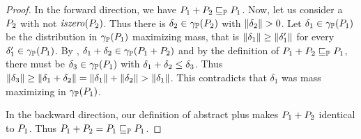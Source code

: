 \begin{proof}
In the
forward direction, we have $ P_{1} + P_{2} \sqsubseteq_{\mathbb{P}} P_{1} $. Now, let
us consider a $ P_{2} $ with not $ \mathit{iszero}(P_{2}) $. Thus there is
$ \delta_2 \in \gamma_{\mathbb{P}}(P_{2}) $ with $ \mathord{\parallel}\delta_2\mathord{\parallel} > 0 $. Let
$ \delta_1 \in \gamma_{\mathbb{P}}(P_{1}) $ be the distribution in
$ \gamma_{\mathbb{P}}(P_{1}) $ maximizing mass, that is
$ \mathord{\parallel}\delta_1\mathord{\parallel} \geq \mathord{\parallel}\delta'_1\mathord{\parallel} $ for every
$ \delta'_1 \in \gamma_{\mathbb{P}}(P_{1}) $. By , $ \delta_1
+ \delta_2 \in \gamma_{\mathbb{P}}(P_{1} + P_{2}) $ and by the definition of
$ P_{1} + P_{2} \sqsubseteq_{\mathbb{P}} P_{1} $, there must be $ \delta_3 \in \gamma_{\mathbb{P}}(P_{1})
$ with $ \delta_1 + \delta_2 \leq \delta_3 $. Thus
$ \mathord{\parallel}\delta_3\mathord{\parallel} \geq \mathord{\parallel}\delta_1 + \delta_2\mathord{\parallel} = \mathord{\parallel}\delta_1\mathord{\parallel}
+ \mathord{\parallel}\delta_2\mathord{\parallel} > \mathord{\parallel}\delta_1\mathord{\parallel} $. This contradicts that
$ \delta_1 $ was mass maximizing in $ \gamma_{\mathbb{P}}(P_{1}) $.

In the backward direction, our definition of abstract plus makes
$ P_{1} + P_{2} $ identical to $ P_{1} $. Thus $ P_{1} + P_{2}
= P_{1} \sqsubseteq_{\mathbb{P}} P_{1} $.

%


\end{proof}
